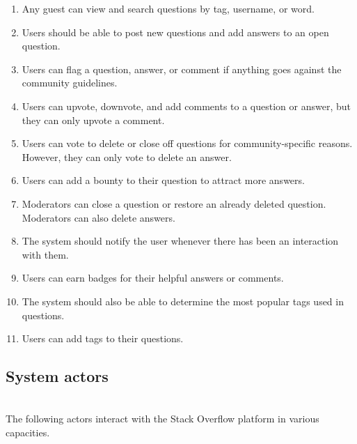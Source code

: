 \begin{enumerate}
\item
\protect{}\label{Q22pDximA13qN916Xneh3}
Any guest can view and search questions by tag, username, or word.
\item
\protect{}\label{-t9pVD6yE4dOn61RPXBWc}
Users should be able to post new questions and add answers to an open question.
\item
\protect{}\label{jHUY5o0PfXBZLXaidOfzc}
Users can flag a question, answer, or comment if anything goes against the community guidelines.
\item
\protect{}\label{eNPgJYx1c2vVjzzb4ygUg}
Users can upvote, downvote, and add comments to a question or answer, but they can only upvote a comment.
\item
\protect{}\label{09KGp4A7nmarUri1_Vi9d}
Users can vote to delete or close off questions for community-specific reasons. However, they can only vote to delete an answer.
\item
\protect{}\label{aAn9Dg0QqfZ1B_oWZ6Cp3}
Users can add a bounty to their question to attract more answers.
\item
\protect{}\label{lFOU7A7dEyz1sk8dUqE_9}
Moderators can close a question or restore an already deleted question. Moderators can also delete answers.
\item
\protect{}\label{puiIjyA2AuGJzGw-56_fK}
The system should notify the user whenever there has been an interaction with them.
\item
\protect{}\label{Pw-kEhG3t04QDOU-yRERq}
Users can earn badges for their helpful answers or comments.
\item
\protect{}\label{wqeLTAE_9nq7La7-1Rz9j}
The system should also be able to determine the most popular tags used in questions.
\item
\protect{}\label{OrTm_F8qblzVlhtKF_2KH}
Users can add tags to their questions.
\end{enumerate}

\subsection{System actors}\label{lMGfZp7nzqVkcj_PNUNjf}
\\
The following actors interact with the Stack Overflow platform in various capacities.

